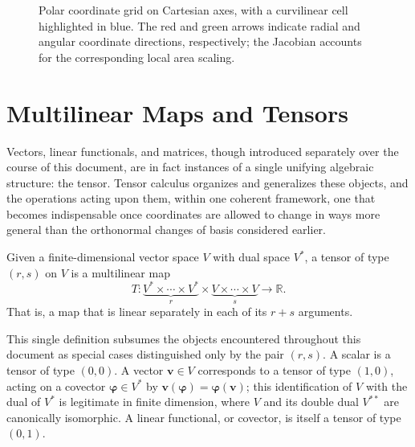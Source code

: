 \begin{figure}[!htbp]
\centering
{}
\caption[Polar grid and Jacobian]{Polar coordinate grid on Cartesian axes, with a curvilinear cell highlighted in blue. The red and green arrows indicate radial and angular coordinate directions, respectively; the Jacobian accounts for the corresponding local area scaling.}
\label{fig:ch10-jacobian-polar}
\end{figure}

\section{Multilinear Maps and Tensors}

Vectors, linear functionals, and matrices, though introduced separately over the course of this document, are in fact instances of a single unifying algebraic structure: the tensor. Tensor calculus organizes and generalizes these objects, and the operations acting upon them, within one coherent framework, one that becomes indispensable once coordinates are allowed to change in ways more general than the orthonormal changes of basis considered earlier.

\begin{definition}[Tensor]
Given a finite-dimensional vector space $V$ with dual space $V^{*}$, a tensor of type $(r,s)$ on $V$ is a multilinear map
\[
T : \underbrace{V^{*} \times \cdots \times V^{*}}_{r} \times \underbrace{V \times \cdots \times V}_{s} \longrightarrow \mathbb{R}.
\]
That is, a map that is linear separately in each of its $r+s$ arguments.
\end{definition}

This single definition subsumes the objects encountered throughout this document as special cases distinguished only by the pair $(r,s)$. A scalar is a tensor of type $(0,0)$. A vector $\mathbf{v} \in V$ corresponds to a tensor of type $(1,0)$, acting on a covector $\boldsymbol{\varphi} \in V^{*}$ by $\mathbf{v}(\boldsymbol{\varphi}) = \boldsymbol{\varphi}(\mathbf{v})$; this identification of $V$ with the dual of $V^{*}$ is legitimate in finite dimension, where $V$ and its double dual $V^{**}$ are canonically isomorphic. A linear functional, or covector, is itself a tensor of type $(0,1)$.

